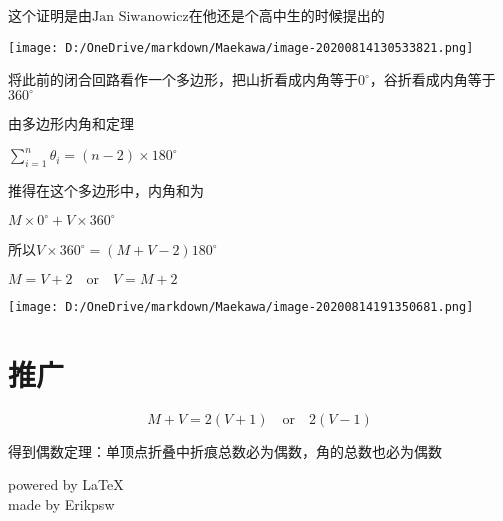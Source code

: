 \documentclass[a4paper,12pt]{article}
\begin{document}
这个证明是由$\text{Jan Siwanowicz}$在他还是个高中生的时候提出的
\begin{center}
\texttt{[image: D:/OneDrive/markdown/Maekawa/image-20200814130533821.png]}\\
\end{center}

将此前的闭合回路看作一个多边形，把山折看成内角等于$0^{\circ}$，谷折看成内角等于$360^{\circ}$

由多边形内角和定理

$\sum\limits_{i=1}^n\theta_i=(n-2)×180^{\circ}$

推得在这个多边形中，内角和为

$M \times 0^{\circ} +V \times 360^{\circ}$

所以$V\times 360^{\circ} = (M +V-2)180^{\circ}$

$ M = V +2 \quad \text{or}\quad V = M + 2$
\begin{center}
\texttt{[image: D:/OneDrive/markdown/Maekawa/image-20200814191350681.png]}\\
\end{center}

\section{推广}
\begin{equation}\label{3}
    M + V = 2(V+1) \quad \text{or} \quad2(V- 1)
    \end{equation}

得到偶数定理：单顶点折叠中折痕总数必为偶数，角的总数也必为偶数
\begin{flushright}
    powered by \LaTeX\\
    made by Erikpsw\\ 
\end{flushright}



\end{document}

